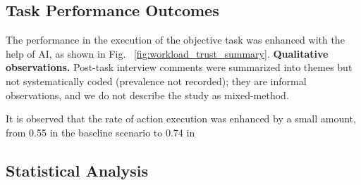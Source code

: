 \documentclass[journal]{IEEEtran}
\theoremstyle{plain}
\theoremstyle{definition}
\providecommand{\DIFaddtex}[1]{{\protect\color{blue} \sf #1}} %
\providecommand{\DIFdeltex}[1]{{\protect\color{red} \scriptsize #1}} %
\providecommand{\DIFaddbegin}{} %
\providecommand{\DIFaddend}{} %
\providecommand{\DIFdelbegin}{} %
\providecommand{\DIFdelend}{} %
\providecommand{\DIFadd}[1]{\texorpdfstring{\DIFaddtex{#1}}{#1}} %
\providecommand{\DIFdel}[1]{\texorpdfstring{\DIFdeltex{#1}}{}} %
\newcommand{\DIFscaledelfig}{0.5}
\newlength{\DIFdelgraphicswidth} %
\newlength{\DIFdelgraphicsheight} %
\newcommand{\DIFaddincludegraphics}[2][]{{\color{blue}\fbox{\DIFOincludegraphics[#1]{#2}}}} %
\newcommand{\DIFdelincludegraphics}[2][]{%
\sbox{\DIFdelgraphicsbox}{\DIFOincludegraphics[#1]{#2}}%
\settoboxwidth{\DIFdelgraphicswidth}{\DIFdelgraphicsbox} %
\settoboxtotalheight{\DIFdelgraphicsheight}{\DIFdelgraphicsbox} %
\scalebox{\DIFscaledelfig}{%
\parbox[b]{\DIFdelgraphicswidth}{\usebox{\DIFdelgraphicsbox}\\[-\baselineskip] \rule{\DIFdelgraphicswidth}{0em}}\llap{\resizebox{\DIFdelgraphicswidth}{\DIFdelgraphicsheight}{%
\setlength{\unitlength}{\DIFdelgraphicswidth}%
\begin{picture}(1,1)%
\thicklines\linethickness{2pt} %
{\color[rgb]{1,0,0}\put(0,0){\framebox(1,1){}}}%
{\color[rgb]{1,0,0}\put(0,0){\line( 1,1){1}}}%
{\color[rgb]{1,0,0}\put(0,1){\line(1,-1){1}}}%
\end{picture}%
}\hspace*{3pt}}} %
} %
\DeclareRobustCommand{\DIFaddbegin}{\DIFOaddbegin \let\includegraphics\DIFaddincludegraphics} %
\DeclareRobustCommand{\DIFaddend}{\DIFOaddend \let\includegraphics\DIFOincludegraphics} %
\DeclareRobustCommand{\DIFdelbegin}{\DIFOdelbegin \let\includegraphics\DIFdelincludegraphics} %
\DeclareRobustCommand{\DIFdelend}{\DIFOaddend \let\includegraphics\DIFOincludegraphics} %
\begin{document}
    \DIFdelbegin \subsection{\DIFdel{Task Performance Outcomes}}
\addtocounter{subsection}{-1}%

\DIFdel{The performance in the execution of the objective task was enhanced with the help of AI, as shown in Fig. ~\ref{fig:workload_trust_summary}. }\DIFdelend \DIFaddbegin \DIFadd{\textbf{Qualitative observations.} Post-task interview comments were summarized into themes but not systematically coded (prevalence not recorded); they are informal observations, and we do not describe the study as mixed-method.
}\DIFaddend 

    \DIFdelbegin \DIFdel{It is observed that the rate of action execution was enhanced by a small amount, from 0.55 in the baseline scenario to 0.74 in }\DIFdelend \DIFaddbegin \subsection{\DIFadd{Statistical Analysis}}
\end{document}
